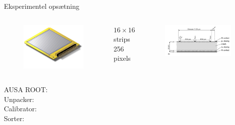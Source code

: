 \begin{frame}{Eksperimentel opsætning}
	\begin{columns}
		\begin{figure}
			\centering
			\includegraphics[width=\columnwidth]{../figures/W1.jpg}
		\end{figure}
		$16\times16$ strips\\
		256 pixels 
		\begin{figure}
			\centering
			\includegraphics[width=\columnwidth]{../figures/dope.png}
		\end{figure}
	\end{columns}
\end{frame}

\begin{frame}{AUSA}
	ROOT:\\
	Unpacker:\\
	Calibrator:\\
	Sorter:\\
\end{frame}

